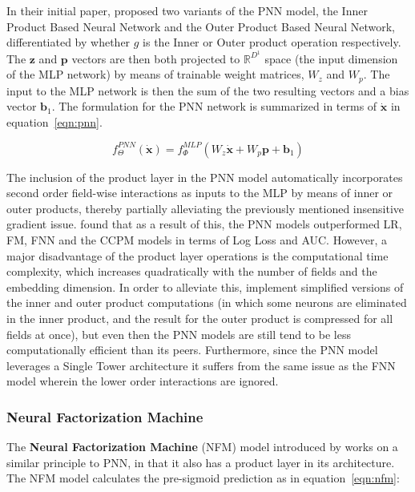 \documentclass{mldsmsc}
\begin{document}
In their initial paper, \cite{RefWorks:qu2016product-based} proposed two variants of the PNN model, the Inner Product Based Neural Network
and the Outer Product Based Neural Network, differentiated by whether $g$ is the Inner or Outer
product operation respectively. The $\mathbf{z}$ and $\mathbf{p}$ vectors are then both
projected to $\mathbb{R}^{D^1}$ space (the input dimension of the MLP network) by means
of trainable weight matrices, $W_z$ and $W_p$. The input to the MLP network is then the
sum of the two resulting vectors and a bias vector $\mathbf{b}_1$. The formulation
for the PNN network is summarized in terms of $\dot{\mathbf{x}}$ in equation~\ref{eqn:pnn}.

\begin{equation}\label{eqn:pnn}
    f_{\Theta}^{PNN}(\dot{\mathbf{x}}) = f_{\Phi}^{MLP}(W_z \dot{\mathbf{x}} + W_p \mathbf{p} + \mathbf{b}_1)
\end{equation}

The inclusion of the product layer in the PNN model automatically incorporates second order field-wise
interactions as inputs to the MLP by means of inner or outer products, thereby partially alleviating
the previously mentioned insensitive gradient issue. \cite{RefWorks:qu2016product-based} found that
as a result of this, the PNN models outperformed LR, FM, FNN and the CCPM models in terms of Log Loss
and AUC. However, a major disadvantage of the product layer operations is the computational time complexity,
which increases quadratically with the number of fields and the embedding dimension. In order to alleviate
this, \cite{RefWorks:qu2016product-based} implement simplified versions of the inner and outer product
computations (in which some neurons are eliminated in the inner product, and the result for the outer product
is compressed for all fields at once), but even then the PNN models are still tend to be less computationally efficient
than its peers. Furthermore, since the PNN model leverages a Single Tower architecture it suffers from the
same issue as the FNN model wherein the lower order interactions are ignored.

\subsubsection{Neural Factorization Machine}

The \textbf{Neural Factorization Machine} (NFM) model introduced by \cite{RefWorks:he2017neural} works
on a similar principle to PNN, in that it also has a product layer in
its architecture. The NFM model calculates the pre-sigmoid prediction as
in equation~\ref{eqn:nfm}:
\end{document}
